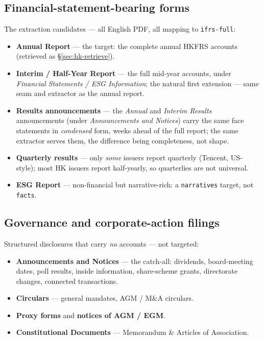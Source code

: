 \documentclass[11pt,a4paper]{report}
\begin{document}
\subsection{Financial-statement-bearing forms}\label{sec:hk-forms-financial}
The extraction candidates --- all English PDF, all mapping to \texttt{ifrs-full}:
\begin{itemize}[nosep]
  \item \textbf{Annual Report} --- the target: the complete annual HKFRS accounts (retrieved as
    \S\ref{sec:hk-retrieve}).
  \item \textbf{Interim / Half-Year Report} --- the full mid-year accounts, under \emph{Financial Statements /
    ESG Information}; the natural first extension --- same seam and extractor as the annual report.
  \item \textbf{Results announcements} --- the \emph{Annual} and \emph{Interim Results} announcements (under
    \emph{Announcements and Notices}) carry the same face statements in \emph{condensed} form, weeks ahead of
    the full report; the same extractor serves them, the difference being completeness, not shape.
  \item \textbf{Quarterly results} --- only \emph{some} issuers report quarterly (Tencent, US-style); most HK
    issuers report half-yearly, so quarterlies are not universal.
  \item \textbf{ESG Report} --- non-financial but narrative-rich: a \texttt{narratives} target, not
    \texttt{facts}.
\end{itemize}

\subsection{Governance and corporate-action filings}\label{sec:hk-forms-governance}
Structured disclosures that carry \emph{no} accounts --- not targeted:
\begin{itemize}[nosep]
  \item \textbf{Announcements and Notices} --- the catch-all: dividends, board-meeting dates, poll results,
    inside information, share-scheme grants, directorate changes, connected transactions.
  \item \textbf{Circulars} --- general mandates, AGM / M\&A circulars.
  \item \textbf{Proxy forms} and \textbf{notices of AGM / EGM}.
  \item \textbf{Constitutional Documents} --- Memorandum \& Articles of Association.
\end{itemize}
\end{document}
